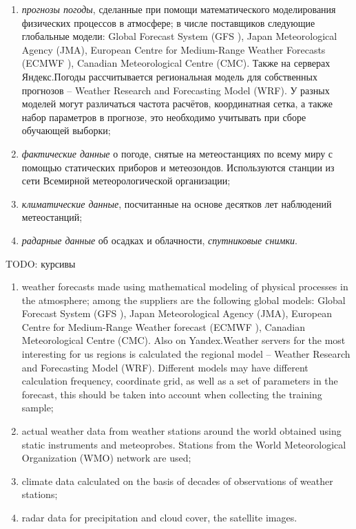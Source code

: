 \documentclass[14pt]{matmex-diploma}
\begin{document}
\begin{enumerate}

    \item \textit{прогнозы погоды}, сделанные при помощи математического моделирования физических процессов в атмосфере; в числе поставщиков следующие глобальные модели: Global Forecast System (GFS \cite{saha2006ncep}), Japan Meteorological Agency (JMA), European Centre for Medium-Range Weather Forecasts (ECMWF \cite{persson2001user}), Canadian Meteorological Centre (CMC). Также на серверах Яндекс.Погоды рассчитывается региональная модель для собственных прогнозов -- Weather Research and Forecasting Model (WRF). У разных моделей могут различаться частота расчётов, координатная сетка, а также набор параметров в прогнозе, это необходимо учитывать при сборе обучающей выборки;

    \item \textit{фактические данные} о погоде, снятые на метеостанциях по всему миру с помощью статических приборов и метеозондов. Используются станции из сети Всемирной метеорологической организации;
    
    \item \textit{климатические данные}, посчитанные на основе десятков лет наблюдений метеостанций;

    \item \textit{радарные данные} об осадках и облачности, \textit{спутниковые снимки}.
\end{enumerate}


TODO: курсивы 
\begin{enumerate}
    \item weather forecasts made using mathematical modeling of physical processes in the atmosphere; among the suppliers are the following global models: Global Forecast System (GFS \cite{saha2006ncep}), Japan Meteorological Agency (JMA), European Centre for Medium-Range Weather forecast (ECMWF \cite{persson2001user}), Canadian Meteorological Centre (CMC). Also on Yandex.Weather servers for the most interesting for us regions is calculated the regional model -- Weather Research and Forecasting Model (WRF). Different models may have different calculation frequency, coordinate grid, as well as a set of parameters in the forecast, this should be taken into account when collecting the training sample;

    \item actual weather data from weather stations around the world obtained using static instruments and meteoprobes. Stations from the World Meteorological Organization (WMO) network are used;
    
    \item climate data calculated on the basis of decades of observations of weather stations;

    \item radar data for precipitation and cloud cover, the satellite images.
\end{enumerate}
\end{document}
